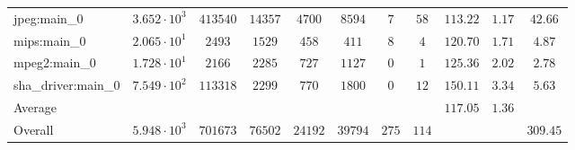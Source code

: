 \begin{tabular}{|l|c|c|c|c|c|c|c|c|c|c|}
jpeg:main\_0            & $ 3.652 \cdot 10^{3}  $ & $ 413540 $ & $ 14357 $ & $ 4700  $ & $ 8594  $ & $ 7   $ & $ 58  $ & $ 113.22      $ & $ 1.17    $ & $ 42.66   $ \\
mips:main\_0            & $ 2.065 \cdot 10^{1}  $ & $ 2493   $ & $ 1529  $ & $ 458   $ & $ 411   $ & $ 8   $ & $ 4   $ & $ 120.70      $ & $ 1.71    $ & $ 4.87    $ \\
mpeg2:main\_0           & $ 1.728 \cdot 10^{1}  $ & $ 2166   $ & $ 2285  $ & $ 727   $ & $ 1127  $ & $ 0   $ & $ 1   $ & $ 125.36      $ & $ 2.02    $ & $ 2.78    $ \\
sha\_driver:main\_0     & $ 7.549 \cdot 10^{2}  $ & $ 113318 $ & $ 2299  $ & $ 770   $ & $ 1800  $ & $ 0   $ & $ 12  $ & $ 150.11      $ & $ 3.34    $ & $ 5.63    $ \\
\hline
Average                 & $                     $ & $        $ & $       $ & $       $ & $       $ & $     $ & $     $ & $ 117.05      $ & $ 1.36    $ & $         $ \\
\hline
Overall                 & $ 5.948 \cdot 10^{3}  $ & $ 701673 $ & $ 76502 $ & $ 24192 $ & $ 39794 $ & $ 275 $ & $ 114 $ & $             $ & $         $ & $ 309.45  $ \\
\hline
\end{tabular}
